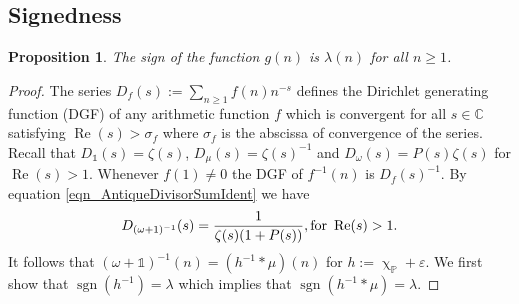 \documentclass[11pt,reqno,a4letter]{article}
\numberwithin{equation}{section}
\numberwithin{figure}{section}
\numberwithin{table}{section}
\renewcommand{\chi}{\upchi}
\theoremstyle{plain}
\newtheorem{prop}[theorem]{Proposition}
\numberwithin{theorem}{section}
\theoremstyle{definition}
\theoremstyle{remark}
\renewcommand{\Re}{\operatorname{Re}}
\newcommand{\mathtext}[1]{\text{\rm #1}}
\begin{document}
\subsection{Signedness}
\label{Section_PrelimProofs_Config} 
\label{subSection_ProofOfSignednessOfgInvn_v1} 

\begin{prop}
\label{prop_SignageDirInvsOfPosBddArithmeticFuncs_v1} 
The sign of the function $g(n)$ is $\lambda(n)$ for all $n \geq 1$. 
\end{prop} 
\begin{proof} 
The series $D_f(s) := \sum_{n \geq 1} f(n) n^{-s}$ defines the 
Dirichlet generating function (DGF) of any 
arithmetic function $f$ which is convergent for all $s \in \mathbb{C}$ satisfying 
$\Re(s) > \sigma_f$ where $\sigma_f$ is the abscissa of convergence of the series. 
Recall that $D_{\mathds{1}}(s) = \zeta(s)$, $D_{\mu}(s) = \zeta(s)^{-1}$ and 
$D_{\omega}(s) = P(s) \zeta(s)$ for $\Re(s) > 1$. 
Whenever $f(1) \neq 0$ the DGF of $f^{-1}(n)$ is $D_f(s)^{-1}$. 
By equation \eqref{eqn_AntiqueDivisorSumIdent} we have 
\begin{align} 
\label{eqn_DGF_of_gInvn} 
D_{(\omega+1)^{-1}}(s) = \frac{1}{\zeta(s) (1+P(s))}, \mathtext{ for } \Re(s) > 1. 
\end{align} 
It follows that $(\omega + \mathds{1})^{-1}(n) = (h^{-1} \ast \mu)(n)$ for 
$h := \chi_{\mathbb{P}} + \varepsilon$. 
We first show that $\operatorname{sgn}(h^{-1}) = \lambda$ which implies that 
$\operatorname{sgn}(h^{-1} \ast \mu) = \lambda$. 


\end{proof}
\end{document}
